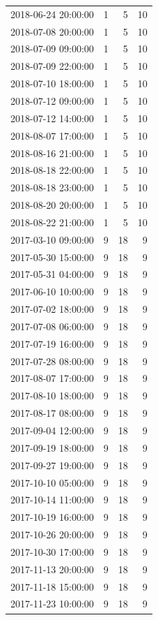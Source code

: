 \begin{tabular}{lrrr}
2018-06-24 20:00:00 & 1 & 5 & 10 \\
2018-07-08 20:00:00 & 1 & 5 & 10 \\
2018-07-09 09:00:00 & 1 & 5 & 10 \\
2018-07-09 22:00:00 & 1 & 5 & 10 \\
2018-07-10 18:00:00 & 1 & 5 & 10 \\
2018-07-12 09:00:00 & 1 & 5 & 10 \\
2018-07-12 14:00:00 & 1 & 5 & 10 \\
2018-08-07 17:00:00 & 1 & 5 & 10 \\
2018-08-16 21:00:00 & 1 & 5 & 10 \\
2018-08-18 22:00:00 & 1 & 5 & 10 \\
2018-08-18 23:00:00 & 1 & 5 & 10 \\
2018-08-20 20:00:00 & 1 & 5 & 10 \\
2018-08-22 21:00:00 & 1 & 5 & 10 \\
2017-03-10 09:00:00 & 9 & 18 & 9 \\
2017-05-30 15:00:00 & 9 & 18 & 9 \\
2017-05-31 04:00:00 & 9 & 18 & 9 \\
2017-06-10 10:00:00 & 9 & 18 & 9 \\
2017-07-02 18:00:00 & 9 & 18 & 9 \\
2017-07-08 06:00:00 & 9 & 18 & 9 \\
2017-07-19 16:00:00 & 9 & 18 & 9 \\
2017-07-28 08:00:00 & 9 & 18 & 9 \\
2017-08-07 17:00:00 & 9 & 18 & 9 \\
2017-08-10 18:00:00 & 9 & 18 & 9 \\
2017-08-17 08:00:00 & 9 & 18 & 9 \\
2017-09-04 12:00:00 & 9 & 18 & 9 \\
2017-09-19 18:00:00 & 9 & 18 & 9 \\
2017-09-27 19:00:00 & 9 & 18 & 9 \\
2017-10-10 05:00:00 & 9 & 18 & 9 \\
2017-10-14 11:00:00 & 9 & 18 & 9 \\
2017-10-19 16:00:00 & 9 & 18 & 9 \\
2017-10-26 20:00:00 & 9 & 18 & 9 \\
2017-10-30 17:00:00 & 9 & 18 & 9 \\
2017-11-13 20:00:00 & 9 & 18 & 9 \\
2017-11-18 15:00:00 & 9 & 18 & 9 \\
2017-11-23 10:00:00 & 9 & 18 & 9 \\

\end{tabular}

